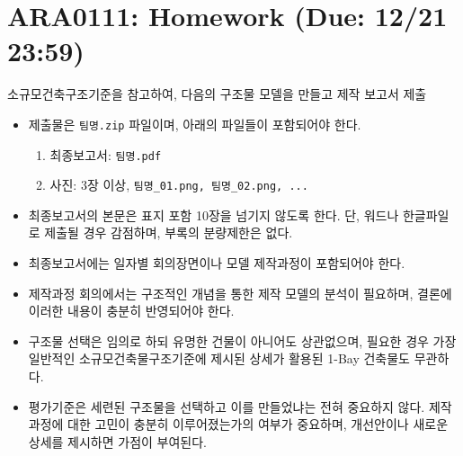 \documentclass[10pt]{article}
\begin{document}
\section*{ARA0111: Homework (Due: 12/21 23:59)}

소규모건축구조기준을 참고하여, 다음의 구조물 모델을 만들고 제작 보고서 제출

\begin{itemize}
	\item 제출물은 \texttt{팀명.zip} 파일이며, 아래의 파일들이 포함되어야 한다.   

\begin{enumerate}
	\item 최종보고서: \texttt{팀명.pdf}
	\item 사진: 3장 이상, \texttt{팀명\_01.png, 팀명\_02.png, ...}
\end{enumerate}
	\item 최종보고서의 본문은 표지 포함 10장을 넘기지 않도록 한다. 단, 워드나 한글파일로 제출될 경우 감점하며, 부록의 분량제한은 없다. 
	\item 최종보고서에는 일자별 회의장면이나 모델 제작과정이 포함되어야 한다. 
	\item 제작과정 회의에서는 구조적인 개념을 통한 제작 모델의 분석이 필요하며, 결론에 이러한 내용이 충분히 반영되어야 한다. 
	\item 구조물 선택은 임의로 하되 유명한 건물이 아니어도 상관없으며, 필요한 경우 가장 일반적인 소규모건축물구조기준에 제시된 상세가 활용된 1-Bay 건축물도 무관하다. 
	\item 평가기준은 세련된 구조물을 선택하고 이를 만들었냐는 전혀 중요하지 않다. 제작과정에 대한 고민이 충분히 이루어졌는가의 여부가 중요하며, 개선안이나 새로운 상세를 제시하면 가점이 부여된다. 
\end{itemize}
\end{document}
